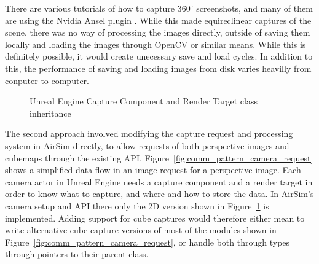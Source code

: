 There are various tutorials of how to capture $360^\circ$ screenshots, and many of them are using the Nvidia Ansel plugin \cite{SceenshotsAnsel}. While this made equireclinear captures of the scene, there was no way of processing the images directly, outside of saving them locally and loading the images through OpenCV or similar means. While this is definitely possible, it would create unecessary save and load cycles. In addition to this, the performance of saving and loading images from disk varies heavilly from conputer to computer.

\begin{figure}[!htb]
    \centering
    \caption{Unreal Engine Capture Component and Render Target class inheritance}
    \label{fig:capture_render_inherit}
\end{figure}

The second approach involved modifying the capture request and processing system in AirSim directly, to allow requests of both perspective images and cubemaps through the existing API. Figure~\ref{fig:comm_pattern_camera_request} shows a simplified data flow in an image request for a perspective image. Each camera actor in Unreal Engine needs a capture component and a render target in order to know what to capture, and where and how to store the data. In AirSim's camera setup and API there only the 2D version shown in Figure~\ref{fig:capture_render_inherit} is implemented. Adding support for cube captures would therefore either mean to write alternative cube capture versions of most of the modules shown in Figure~\ref{fig:comm_pattern_camera_request}, or handle both through types through pointers to their parent class.

